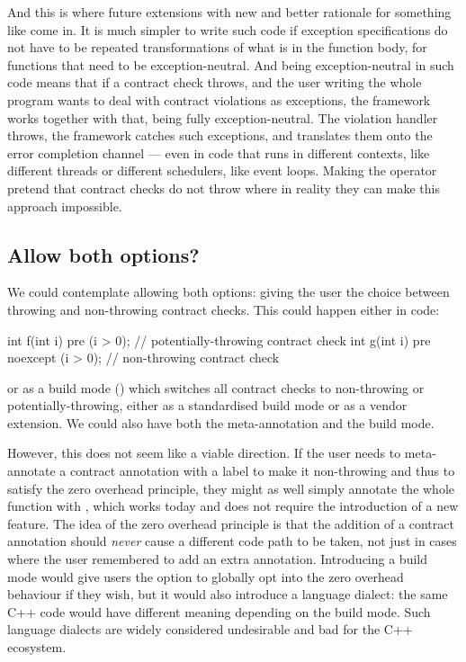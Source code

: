 And this is where future extensions with new and better rationale for something like  come in. It is much simpler to write such code if exception specifications do not have to be repeated transformations of what is in the function body, for functions that need to be exception-neutral. And being exception-neutral in such code means that if a contract check throws, and the user writing the whole program wants to deal with contract violations as exceptions, the framework works together with that, being fully exception-neutral. The violation handler throws, the framework catches such exceptions, and translates them onto the error completion channel --- even in code that runs in different contexts, like different threads or different schedulers, like event loops. Making the  operator pretend that contract checks do not throw where in reality they can make this approach impossible.

\subsection{Allow both options?}

We could contemplate allowing both options: giving the user the choice between throwing and non-throwing contract checks. This could happen either in code:

\begin{codeblock}
int f(int i)
  pre (i > 0);  // potentially-throwing contract check
int g(int i)
  pre noexcept (i > 0);  // non-throwing contract check
\end{codeblock}

or as a build mode () which switches all contract checks to non-throwing or potentially-throwing, either as a standardised build mode or as a vendor extension. We could also have both the meta-annotation and the build mode.

However, this does not seem like a viable direction. If the user needs to meta-annotate a contract annotation with a  label to make it non-throwing and thus to satisfy the zero overhead principle, they might as well simply annotate the whole function with , which works today and does not require the introduction of a new feature. The idea of the zero overhead principle is that the addition of a contract annotation should \emph{never} cause a different code path to be taken, not just in cases where the user remembered to add an extra annotation. Introducing a build mode would give users the option to globally opt into the zero overhead behaviour if they wish, but it would also introduce a language dialect: the same C++ code would have different meaning depending on the build mode. Such language dialects are widely considered undesirable and bad for the C++ ecosystem.

